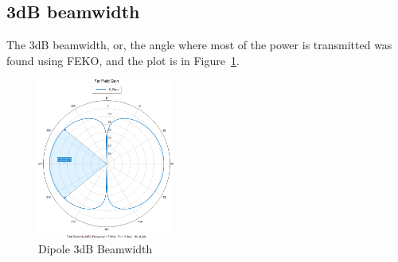 \subsection{3dB beamwidth}

The 3dB beamwidth, or, the angle where most of the power is transmitted was
found using FEKO, and the plot is in Figure~\ref{fig:3dbbeamw}.


\begin{figure}[h!]
  \centering
  \includegraphics[width=0.40\textwidth]{./img/3dbeamw.png}
  \caption{Dipole 3dB Beamwidth}
  \label{fig:3dbbeamw}
\end{figure}
